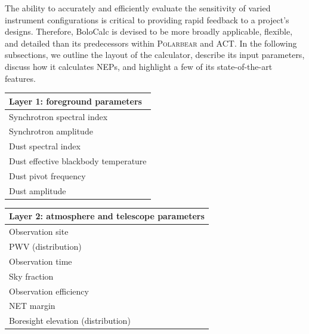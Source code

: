 The ability to accurately and efficiently evaluate the sensitivity of varied instrument configurations is critical to providing rapid feedback to a project's designs. Therefore, BoloCalc is devised to be more broadly applicable, flexible, and detailed than its predecessors within \textsc{Polarbear} and ACT. In the following subsections, we outline the layout of the calculator, describe its input parameters, discuss how it calculates NEPs, and highlight a few of its state-of-the-art features.

\begin{table}[!ht]
	\centering
    \begin{minipage}[t]{0.45\textwidth}
    \centering
    \tabulinesep=0.8mm
	\begin{tabu}[t]{|| X[1,c] ||}
    \hline
    \textbf{Layer 1: foreground parameters} \\
    \hline
    \hline
    Synchrotron spectral index \\
    \hline
    Synchrotron amplitude \\
    \hline
    Dust spectral index \\
    \hline
    Dust effective blackbody temperature \\
    \hline
    Dust pivot frequency \\
    \hline
    Dust amplitude \\
    \hline
    \end{tabu}
    \end{minipage}
    \begin{minipage}[t]{0.45\textwidth}
    \tabulinesep=0.8mm
    \begin{tabu}[t]{|| X[1,c] ||}
    \hline
    \textbf{Layer 2: atmosphere and telescope parameters} \\
    \hline
    \hline
    Observation site \\
    \hline
    PWV (distribution) \\
    \hline
    Observation time \\
    \hline
    Sky fraction \\
    \hline
    Observation efficiency \\
    \hline
    NET margin \\
    \hline
    Boresight elevation (distribution) \\
    \hline
    \end{tabu}
    \end{minipage}
    \begin{minipage}[t]{0.45\textwidth}
    \centering
    \vspace{2mm}

\end{minipage}
\end{table}
